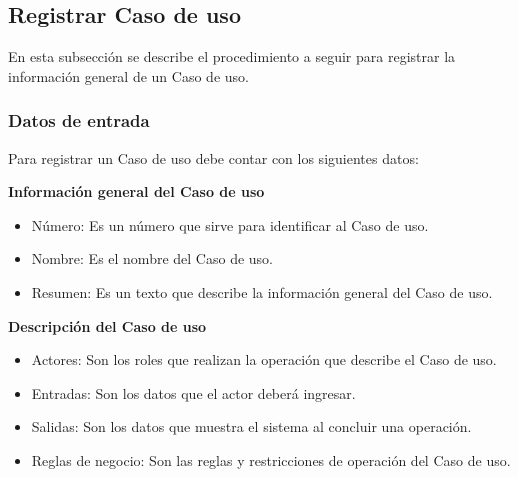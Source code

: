 \subsection{Registrar Caso de uso}
En esta subsección se describe el procedimiento a seguir para registrar la información general de un Caso de uso.

\subsubsection{Datos de entrada}
\begin{description}
	\item Para registrar un Caso de uso debe contar con los siguientes datos: \hspace{10pt}
	
	\begin{description}
	    \item \textbf{Información general del Caso de uso}
	    \begin{itemize}
		  \item Número: Es un número que sirve para identificar al Caso de uso.
		  \item Nombre: Es el nombre del Caso de uso.
		  \item Resumen: Es un texto que describe la información general del Caso de uso.
	    \end{itemize}
	    \item \textbf{Descripción del Caso de uso}
	    \begin{itemize}
		  \item Actores: Son los roles que realizan la operación que describe el Caso de uso.
		  \item Entradas: Son los datos que el actor deberá ingresar.
		  \item Salidas: Son los datos que muestra el sistema al concluir una operación.
		  \item Reglas de negocio: Son las reglas y restricciones de operación del Caso de uso.
	    \end{itemize}
	 \end{description}
\end{description}

